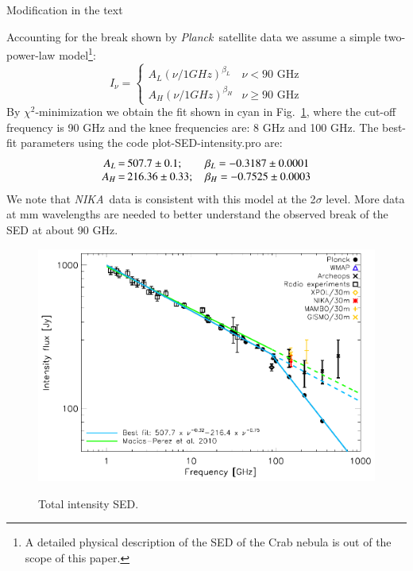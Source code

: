 \documentclass[report,twocolumn]{aa}
\def\NIKA{\textit{NIKA}}
\def\Planck{\textit{Planck}}
\begin{document}
{\color{red} Modification in the text}

Accounting for the break shown by \Planck\ satellite data we assume a simple
two-power-law model\footnote{A detailed physical description of the SED of the
  Crab nebula is out of the scope of this paper.}:
\begin{equation}
I_{\nu} = \left\{ 
\begin{array}{rl}A_L(\nu/1GHz)^{\beta_L} &\mbox{$\nu<90$ GHz} \\
   A_H(\nu/1GHz)^{\beta_H} &\mbox{$\nu\geq90$ GHz}
  \end{array} \right.    
\end{equation}
By $\chi^2$-minimization we obtain the fit shown in cyan in Fig.~{\ref{crab_int_SED}},
where the cut-off frequency is 90 GHz and the knee frequencies are: 8 GHz and 100 GHz. 
The best-fit parameters using the code plot-SED-intensity.pro are:
$$\setlength\arraycolsep{0.1em}
 \begin{array}{rclcl}
  A_L&=& 507.7\pm0.1 ; \quad \quad   \beta_L = -0.3187\pm0.0001\\
  A_H&=& 216.36\pm0.33 ; \quad \beta_H = -0.7525\pm0.0003
 \end{array}
$$
We note that \NIKA\ data is consistent with this model at the 2$\sigma$ level. More data at mm wavelengths are needed to better understand the observed break of the SED at about 90 GHz. 



\begin{figure}[!ht]
\centering
     	  { \includegraphics[width=1\linewidth,keepaspectratio]{referee_figures/Crab_SED_int_test.pdf}}
\caption{Total intensity SED.}     	  
 
\label{crab_int_SED}
\end{figure}
\end{document}
